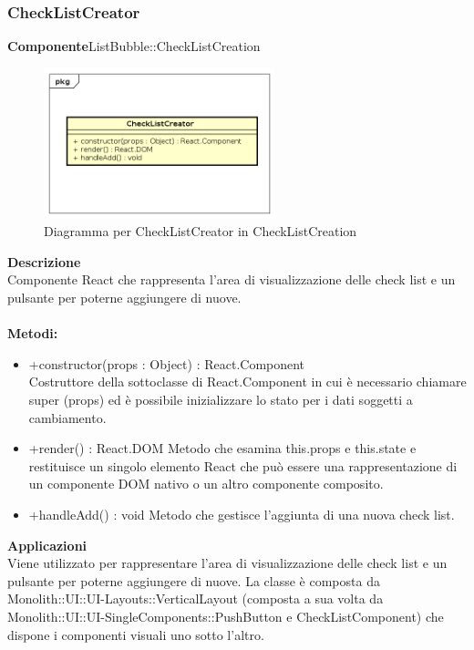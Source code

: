 \clearpage

\subsubsection{CheckListCreator}
\textbf{Componente}ListBubble::CheckListCreation\\
   \FloatBarrier
   \begin{figure}[ht]
   \centering
   \includegraphics[width=0.6\textwidth]{img/single-CheckListCreator}
   \caption{{Diagramma per CheckListCreator in CheckListCreation}}
\end{figure}
\FloatBarrier
\textbf{Descrizione}\\
Componente React che rappresenta l'area di visualizzazione delle check list e un pulsante per poterne aggiungere di nuove. 
\\
\\
\textbf{Metodi:} 
\begin{itemize}
\item +constructor(props : Object) : React.Component 
\\
Costruttore della sottoclasse di React.Component in cui è necessario chiamare super (props) ed è possibile inizializzare lo stato per i dati soggetti a cambiamento.

\item +render() : React.DOM
Metodo che esamina this.props e this.state e restituisce un singolo elemento React che può essere una rappresentazione di un componente DOM nativo o un altro componente composito.

\item +handleAdd() : void
Metodo che gestisce l'aggiunta di una nuova check list. 
\end{itemize} 


\textbf{Applicazioni}\\
Viene utilizzato per rappresentare l'area di visualizzazione delle check list e un pulsante per poterne aggiungere di nuove. 
La classe è composta da Monolith::UI::UI-Layouts::VerticalLayout (composta a sua volta da Monolith::UI::UI-SingleComponents::PushButton e CheckListComponent) che dispone i componenti visuali uno sotto l'altro. 


